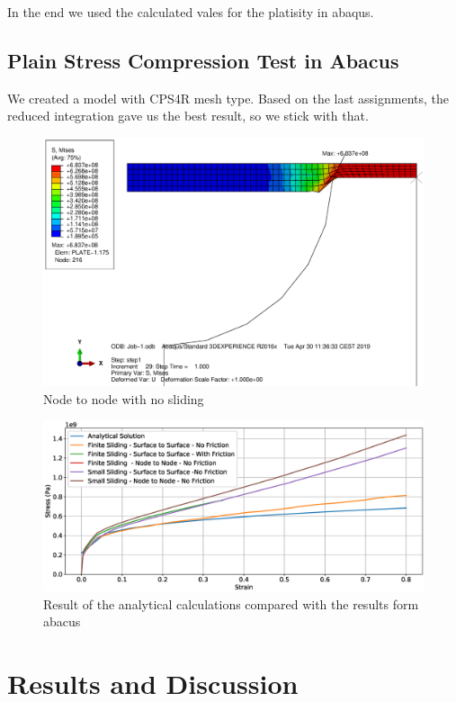 \documentclass[12pt]{article}
\begin{document}
In the end we used the calculated vales for the platisity in abaqus.

\newpage
\subsection{Plain Stress Compression Test in Abacus}

We created a model with CPS4R mesh type. Based on the last assignments, the reduced integration
gave us the best result, so we stick with that.

\begin{figure}[!htb]
  \centering
  \includegraphics[width=0.9\linewidth]{pics/node_to_node_no_sliding}
  \caption{Node to node with no sliding}
  \label{fig:2}
\end{figure}

\begin{figure}[!htb]
  \centering
  \includegraphics[width=0.9\linewidth]{pics/analytical_compared}
  \caption{Result of the analytical calculations compared with the results form abacus}
  \label{fig:2}
\end{figure}


\pagebreak
\section{Results and Discussion}
\end{document}
